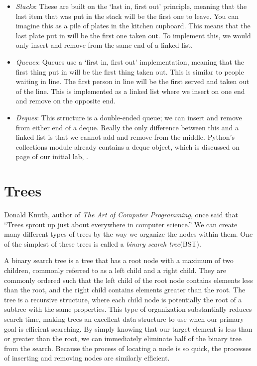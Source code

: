 \begin{itemize}
\item \emph{Stacks}: These are built on the `last in, first out' principle, meaning that the last item that was put in the stack will be the first one to leave.
You can imagine this as a pile of plates in the kitchen cupboard.
This means that the last plate put in will be the first one taken out.
To implement this, we would only insert and remove from the same end of a linked list.
\item \emph{Queues}: Queues use a `first in, first out' implementation, meaning that the first thing put in will be the first thing taken out.
This is similar to people waiting in line.
The first person in line will be the first served and taken out of the line.
This is implemented as a linked list where we insert on one end and remove on the opposite end.
\item \emph{Deques}: This structure is a double-ended queue; we can insert and remove from either end of a deque.
Really the only difference between this and a linked list is that we cannot add and remove from the middle.
Python's collections module already contains a deque object, which is discussed on page \pageref{deques} of our initial lab, .
\end{itemize}

\section*{Trees}
\label{Binary Search Tree}
Donald Knuth, author of \emph{The Art of Computer Programming}, once said that ``Trees sprout up just about everywhere in computer science.''
We can create many different types of trees by the way we organize the nodes within them.
One of the simplest of these trees is called a \emph{binary search tree}(BST).

A binary search tree is a tree that has a root node with a maximum of two children, commonly referred to as a left child and a right child.
They are commonly ordered such that the left child of the root node contains elements less than the root, and the right child contains elements greater than the root.
The tree is a recursive structure, where each child node is potentially the root of a subtree with the same properties.
This type of organization substantially reduces search time, making trees an excellent data structure to use when our primary goal is efficient searching.
By simply knowing that our target element is less than or greater than the root, we can immediately eliminate half of the binary tree from the search.
Because the process of locating a node is so quick, the processes of inserting and removing nodes are similarly efficient.

